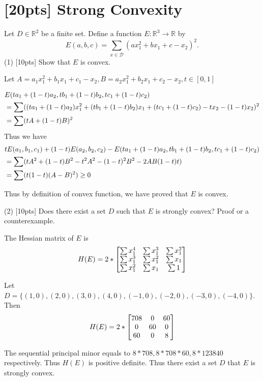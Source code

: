 	\section{[20pts] Strong Convexity}
	Let $D\in \mathbb{R}^2$ be a finite set. Define a function $E: \mathbb{R}^3 \rightarrow \mathbb{R}$ by\\
	\begin{equation}
	E(a,b,c)=\sum\limits_{x\in\mathcal{D}}(ax^2_1+bx_1+c-x_2)^2.
	\end{equation}
	(1) [10pts] Show that $E$ is convex.\\
	\begin{solution}
		Let $A=a_1x_1^2+b_1x_1+c_1-x_2, B=a_2x_1^2+b_2x_1+c_2-x_2,t\in [0,1]$

		\begin{align}
			& E(ta_1+(1-t)a_2,tb_1+(1-t)b_2,tc_1+(1-t)c_2)\notag \\
			&=\sum ((ta_1+(1-t)a_2)x_1^2+(tb_1+(1-t)b_2)x_1+(tc_1+(1-t)c_2)-tx_2-(1-t)x_2)^2\notag\\
			&= \sum (tA+(1-t)B)^2 \notag
		\end{align}
		Thus we have
		\begin{align}
			& tE(a_1,b_1,c_1) + (1-t)E(a_2,b_2,c_2) - E(ta_1+(1-t)a_2,tb_1+(1-t)b_2,tc_1+(1-t)c_2)\notag\\
			& = \sum (tA^2+(1-t)B^2-t^2A^2-(1-t)^2B^2-2AB(1-t)t) \notag\\
			& = \sum (t(1-t)(A-B)^2) \geq 0\notag
		\end{align}

		Thus by definition of convex function, we have proved that $E$ is convex.
	\end{solution}

	(2) [10pts] Does there exist a set $D$ such that $E$ is strongly convex? Proof or a counterexample.

	\begin{solution}
		The Hessian matrix of $E$ is
		\begin{equation}
			H(E) = 2*\begin{bmatrix}
				\sum x_1^4 & \sum x_1^3 & \sum x_1^2 \\
				\sum x_1^3 & \sum x_1^2 & \sum x_1\\
				\sum x_1^2 & \sum x_1 & \sum 1
			\end{bmatrix}\notag
		\end{equation}

		Let $D=\{(1,0),(2,0),(3,0),(4,0),(-1,0),(-2,0),(-3,0),(-4,0)\}$. Then 
		\begin{equation}
			H(E) = 2*\begin{bmatrix}
				708 & 0 & 60 \\
				0 & 60 & 0\\
				60 & 0 & 8
			\end{bmatrix}\notag
		\end{equation}

		The sequential principal minor equals to $8*708,8*708*60,8*123840$ respectively. Thus $H(E)$ is positive definite. Thus there exist a set $D$ that $E$ is strongly convex.

	\end{solution}
	
